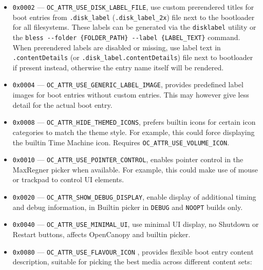 \documentclass[]{article}
\makeatletter
\renewcommand{\label}[1]{%
\zref@wrapper@immediate{\oldlabel{#1}}}  %
\makeatother
\begin{document}
\begin{enumerate}
\begin{itemize}
    \emph{Note 1}: The Apple picker partially supports placing a volume icon file
    at the operating system's \texttt{Data} volume root, \texttt{/System/Volumes/Data/}, when
    mounted at the default location within macOS. This approach is flawed: the file is neither
    accessible to OpenCanopy nor to the Apple picker when FileVault 2, which is meant to be the
    default choice, is enabled. Therefore, OpenCanopy does not attempt supporting Apple's approach.
    A volume icon file may be placed at the root of the \texttt{Preboot} volume for compatibility
    with both OpenCanopy and the Apple picker, or use the \texttt{Preboot} per-volume location as
    above with OpenCanopy as a preferred alternative to Apple's approach. \medskip

    \emph{Note 2}: Be aware that using a volume icon on any drive overrides the normal
    MaxRegner picker behaviour for that drive of selecting the appropriate icon depending
    on whether the drive is internal or external. \medskip

  \item \texttt{0x0002} --- \texttt{OC\_ATTR\_USE\_DISK\_LABEL\_FILE}, use custom
    prerendered titles for boot entries from \texttt{.disk\_label} (\texttt{.disk\_label\_2x})
    file next to the bootloader for all filesystems.
    These labels can be generated via the \texttt{disklabel} utility or the
    \texttt{bless -{}-folder \{FOLDER\_PATH\} -{}-label \{LABEL\_TEXT\}} command.
    When prerendered labels are disabled or missing, use label text in \texttt{.contentDetails}
    (or \texttt{.disk\_label.contentDetails}) file next to bootloader if present instead, otherwise
    the entry name itself will be rendered.
  \item \texttt{0x0004} --- \texttt{OC\_ATTR\_USE\_GENERIC\_LABEL\_IMAGE}, provides predefined
    label images for boot entries without custom entries. This may however give less detail for
    the actual boot entry.
  \item \texttt{0x0008} --- \texttt{OC\_ATTR\_HIDE\_THEMED\_ICONS}, prefers builtin icons
    for certain icon categories to match the theme style. For example, this could force
    displaying the builtin Time Machine icon. Requires \texttt{OC\_ATTR\_USE\_VOLUME\_ICON}.
  \item \texttt{0x0010} --- \texttt{OC\_ATTR\_USE\_POINTER\_CONTROL}, enables pointer control
  in the MaxRegner picker when available. For example, this could make use of mouse or trackpad to
  control UI elements.
  \item \texttt{0x0020} --- \texttt{OC\_ATTR\_SHOW\_DEBUG\_DISPLAY}, enable display of additional
  timing and debug information, in Builtin picker in \texttt{DEBUG} and \texttt{NOOPT}
  builds only.
  \item \texttt{0x0040} --- \texttt{OC\_ATTR\_USE\_MINIMAL\_UI}, use minimal UI display, no
  Shutdown or Restart buttons, affects OpenCanopy and builtin picker.
  \item \texttt{0x0080} --- \texttt{OC\_ATTR\_USE\_FLAVOUR\_ICON}\label{oc-attr-use-flavour-icon},
  provides flexible boot entry content description, suitable for picking the best media across
  different content sets:


\end{itemize}
\end{enumerate}
\end{document}
